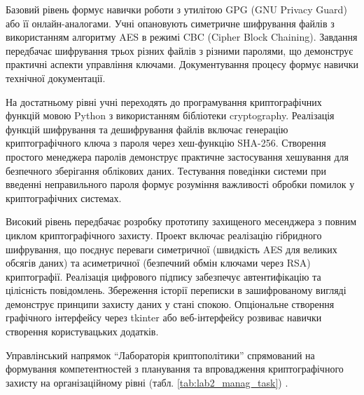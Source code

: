 Базовий рівень формує навички роботи з утилітою GPG (GNU Privacy Guard) або її онлайн-аналогами. Учні опановують симетричне шифрування файлів з використанням алгоритму AES в режимі CBC (Cipher Block Chaining). Завдання передбачає шифрування трьох різних файлів з різними паролями, що демонструє практичні аспекти управління ключами. Документування процесу формує навички технічної документації.

На достатньому рівні учні переходять до програмування криптографічних функцій мовою Python з використанням бібліотеки cryptography. Реалізація функцій шифрування та дешифрування файлів включає генерацію криптографічного ключа з пароля через хеш-функцію SHA-256. Створення простого менеджера паролів демонструє практичне застосування хешування для безпечного зберігання облікових даних. Тестування поведінки системи при введенні неправильного пароля формує розуміння важливості обробки помилок у криптографічних системах.

Високий рівень передбачає розробку прототипу захищеного месенджера з повним циклом криптографічного захисту. Проект включає реалізацію гібридного шифрування, що поєднує переваги симетричної (швидкість AES для великих обсягів даних) та асиметричної (безпечний обмін ключами через RSA) криптографії. Реалізація цифрового підпису забезпечує автентифікацію та цілісність повідомлень. Збереження історії переписки в зашифрованому вигляді демонструє принципи захисту даних у стані спокою. Опціональне створення графічного інтерфейсу через tkinter або веб-інтерфейсу розвиває навички створення користувацьких додатків.





Управлінський напрямок ``Лабораторія криптополітики'' спрямований на формування компетентностей з планування та впровадження криптографічного захисту на організаційному рівні (табл. \ref{tab:lab2_manag_task}) .

